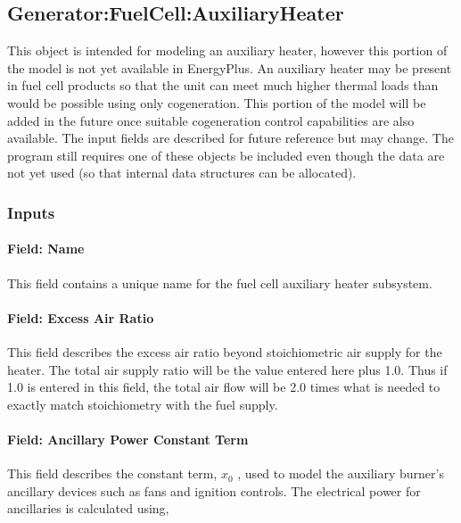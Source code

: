\subsection{Generator:FuelCell:AuxiliaryHeater}\label{generatorfuelcellauxiliaryheater}

This object is intended for modeling an auxiliary heater, however this portion of the model is not yet available in EnergyPlus. An auxiliary heater may be present in fuel cell products so that the unit can meet much higher thermal loads than would be possible using only cogeneration. This portion of the model will be added in the future once suitable cogeneration control capabilities are also available. The input fields are described for future reference but may change. The program still requires one of these objects be included even though the data are not yet used (so that internal data structures can be allocated).

\subsubsection{Inputs}\label{inputs-16-002}

\paragraph{Field: Name}\label{field-name-18-000}

This field contains a unique name for the fuel cell auxiliary heater subsystem.

\paragraph{Field: Excess Air Ratio}\label{field-excess-air-ratio}

This field describes the excess air ratio beyond stoichiometric air supply for the heater. The total air supply ratio will be the value entered here plus 1.0. Thus if 1.0 is entered in this field, the total air flow will be 2.0 times what is needed to exactly match stoichiometry with the fuel supply.

\paragraph{Field: Ancillary Power Constant Term}\label{field-ancillary-power-constant-term}

This field describes the constant term, \({x_0}\) , used to model the auxiliary burner's ancillary devices such as fans and ignition controls. The electrical power for ancillaries is calculated using,

